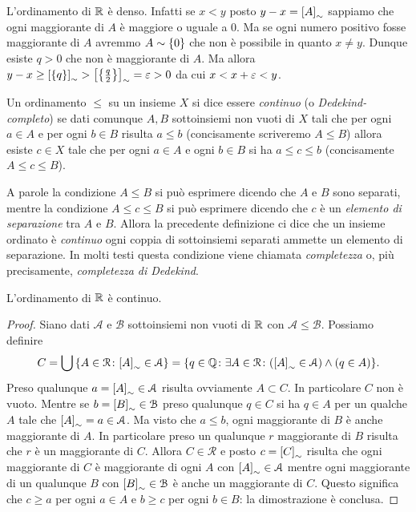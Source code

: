 L'ordinamento di ${\mathbb R}$ è denso. Infatti se $x<y$ posto $y-x={\left[ A \right]}_\sim$ 
sappiamo che ogni maggiorante di $A$ è maggiore o uguale a $0$.
Ma se ogni numero positivo fosse maggiorante di $A$ avremmo $A\sim{\left\{ 0 \right\}}$
che non è possibile in quanto $x\neq y$. Dunque esiste $q>0$ 
che non è maggiorante di $A$. 
Ma allora $y-x \ge {\left[ {\left\{ q \right\}} \right]}_\sim > {\left[ {\left\{ \frac q 2 \right\}} \right]}_\sim = \varepsilon > 0$
da cui $x<x+\varepsilon<y$.

\begin{definition}
  \label{def:ordinamento_continuo}%
  Un ordinamento $\le$ su un insieme $X$ si dice essere
  \emph{continuo}%
%
  (o \emph{Dedekind-completo})
  se dati comunque $A,B$ sottoinsiemi non vuoti di $X$
    tali che per ogni $a\in A$ e per ogni $b\in B$ risulta $a\le b$
    (concisamente scriveremo $A\le B$)
    allora esiste $c\in X$ tale che per ogni $a\in A$ e ogni $b\in B$ 
    si ha $a\le c \le b$ (concisamente $A\le c \le B$).
\end{definition}
  
A parole la condizione $A\le B$ 
si può esprimere dicendo che $A$ e $B$ sono separati, 
mentre la condizione $A\le c \le B$ 
si può esprimere dicendo che $c$ è un \emph{elemento di separazione}
tra $A$ e $B$. 
Allora la precedente definizione ci dice che un insieme ordinato
è \emph{continuo} ogni coppia di sottoinsiemi separati 
ammette un elemento di separazione.
In molti testi questa condizione viene chiamata \emph{completezza}
o, più precisamente, \emph{completezza di Dedekind}.
%
%

\begin{theorem}  
L'ordinamento di ${\mathbb R}$ è continuo.
\end{theorem}
\begin{proof}
Siano dati $\mathcal A$ e $\mathcal B$ sottoinsiemi non vuoti di ${\mathbb R}$ 
con $\mathcal A\le \mathcal B$. 
Possiamo definire
\[
  C = \bigcup{\left\{ A\in \mathcal R\colon {\left[ A \right]}_\sim \in \mathcal A \right\}} 
    = {\left\{ q\in {\mathbb Q}\colon \exists A\in \mathcal R\colon 
    ({\left[ A \right]}_\sim \in \mathcal A) \land (q\in A) \right\}}.
\]
Preso qualunque $a={\left[ A \right]}_\sim \in \mathcal A$ risulta 
ovviamente $A\subset C$. In particolare $C$ non è vuoto.
Mentre se $b={\left[ B \right]}_\sim \in \mathcal B$ 
preso qualunque $q\in C$ si ha $q\in A$ per un qualche $A$ tale che 
${\left[ A \right]}_\sim = a\in \mathcal A$.
Ma visto che $a\le b$, ogni maggiorante di $B$ è anche maggiorante di $A$.
In particolare preso un qualunque $r$ maggiorante di $B$
risulta che $r$ è un maggiorante di $C$.
Allora $C\in \mathcal R$ e posto $c={\left[ C \right]}_\sim$ 
risulta che ogni maggiorante di $C$ è maggiorante di 
ogni $A$ con ${\left[ A \right]}_\sim \in \mathcal A$ mentre 
ogni maggiorante di un qualunque $B$ con ${\left[ B \right]}_\sim\in \mathcal B$ 
è anche un maggiorante di $C$.
Questo significa che $c\ge a$ per ogni $a\in A$ 
e $b\ge c$ per ogni $b\in B$: la dimostrazione è conclusa.
\end{proof}


